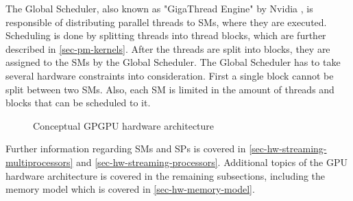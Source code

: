 The Global Scheduler, also known as "GigaThread Engine" by Nvidia \cite{Nvidia2009}, is responsible of distributing parallel threads to SMs, where they are executed.
Scheduling is done by splitting threads into thread blocks, which are further described in \cref{sec-pm-kernels}.
After the threads are split into blocks, they are assigned to the SMs by the Global Scheduler.
The Global Scheduler has to take several hardware constraints into consideration.
First a single block cannot be split between two SMs.
Also, each SM is limited in the amount of threads and blocks that can be scheduled to it. 

\begin{figure}[ht]
	\centering
	\caption{Conceptual GPGPU hardware architecture}
	\label{fig:hw-gpu}
\end{figure}


Further information regarding SMs and SPs is covered in \cref{sec-hw-streaming-multiprocessors} and \cref{sec-hw-streaming-processors}.
Additional topics of the GPU hardware architecture is covered in the remaining subsections, including the memory model which is covered in \cref{sec-hw-memory-model}.

